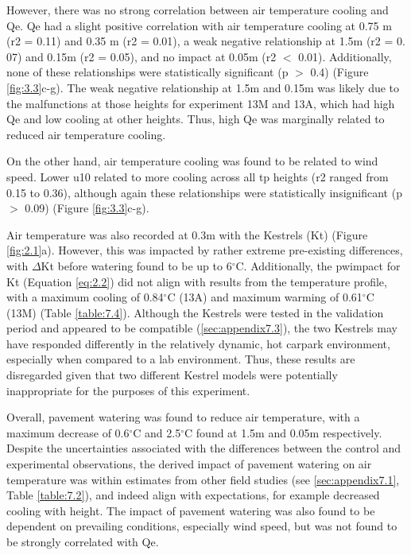 \documentclass[final,3p,times,authoryear]{elsarticle}
\begin{document}
However, there was no strong correlation between air temperature cooling and \gls{Qe}. \gls{Qe} had a slight positive correlation with air temperature cooling at 0.75 m (\gls{r2} = 0.11) and 0.35 m (\gls{r2} = 0.01), a weak negative relationship at 1.5m (\gls{r2} = 0. 07) and 0.15m (\gls{r2} = 0.05), and no impact at 0.05m (\gls{r2} $<$ 0.01). Additionally, none of these relationships were statistically significant (\gls{p} $>$ 0.4) (Figure \ref{fig:3.3}c-g). The weak negative relationship at 1.5m and 0.15m was likely due to the malfunctions at those heights for experiment 13M and 13A, which had high \gls{Qe} and low cooling at other heights. Thus, high \gls{Qe} was marginally related to reduced air temperature cooling.

On the other hand, air temperature cooling was found to be related to wind speed. Lower \gls{u10} related to more cooling across all \gls{tp} heights (\gls{r2} ranged from 0.15 to 0.36), although again these relationships were statistically insignificant (\gls{p} $>$ 0.09) (Figure \ref{fig:3.3}c-g).

Air temperature was also recorded at 0.3m with the Kestrels (\gls{Kt}) (Figure \ref{fig:2.1}a). However, this was impacted by rather extreme pre-existing differences, with $\Delta$\gls{Kt} before watering found to be up to 6$^{\circ}$C. Additionally, the \gls{pwimpact} for \gls{Kt} (Equation \ref{eq:2.2}) did not align with results from the temperature profile, with a maximum cooling of 0.84$^{\circ}$C (13A) and maximum warming of 0.61$^{\circ}$C (13M) (Table \ref{table:7.4}). Although the Kestrels were tested in the validation period and appeared to be compatible (\ref{sec:appendix7.3}), the two Kestrels may have responded differently in the relatively dynamic, hot carpark environment, especially when compared to a lab environment. Thus, these results are disregarded given that two different Kestrel models were potentially inappropriate for the purposes of this experiment.

Overall, pavement watering was found to reduce air temperature, with a maximum decrease of 0.6$^{\circ}$C and 2.5$^{\circ}$C found at 1.5m and 0.05m respectively. Despite the uncertainties associated with the differences between the control and experimental observations, the derived impact of pavement watering on air temperature was within estimates from other field studies (see \ref{sec:appendix7.1}, Table \ref{table:7.2}), and indeed align with expectations, for example decreased cooling with height. The impact of pavement watering was also found to be dependent on prevailing conditions, especially wind speed, but was not found to be strongly correlated with \gls{Qe}.
\end{document}
